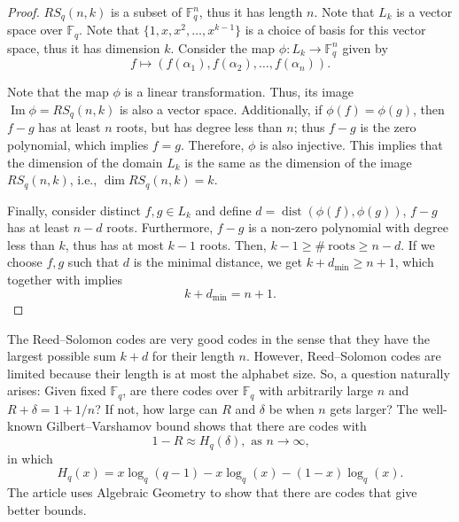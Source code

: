 \documentclass[11pt, oneside]{amsart}
\theoremstyle{definition}
\theoremstyle{remark}
\numberwithin{equation}{section}
\DeclareMathOperator{\dist}{dist}
\DeclareMathOperator{\Ima}{Im}
\DeclareMathOperator{\dimension}{dim}
\begin{document}
\begin{proof}
	$RS_q(n, k)$ is a subset of $\mathbb{F}_q^n$, thus it has length $n$.  
	Note that $ L_k$ is a vector space over $\mathbb{F}_q$.
	Note that $\{1, x, x^2, \dots, x^{k-1}\}$ is a choice of basis for this vector space, thus it has dimension $k$.
	Consider the map $\phi:  L_k \to \mathbb{F}_q^n$ given by 
	\begin{equation}
		f \mapsto (f(\alpha_1), f(\alpha_2), \dots, f(\alpha_n)).
	\end{equation}

	Note that the map $\phi$ is a linear transformation.
	Thus, its image $\Ima \phi = RS_q(n, k)$ is also a vector space.  
	Additionally, if $\phi(f) = \phi(g)$, then $f - g$ has at least $n$ roots, but has degree less than $n$; thus $f - g$ is the zero polynomial, which implies $f = g$.
	Therefore, $\phi$ is also injective.
	This implies that the dimension of the domain $ L_k$ is the same as the dimension of the image $RS_q(n, k)$, i.e.,  $\dimension RS_q(n, k) = k$.
	
	Finally, consider distinct $f, g \in  L_k$ and define $d = \dist(\phi(f), \phi(g))$, $f - g$ has at least $n - d$ roots.
	Furthermore, $f - g$ is a non-zero polynomial with degree less than $k$, thus has at most $k - 1$ roots.
	Then,  $ k - 1 \ge \#\ \text{roots} \ge n - d$.
	If we choose $f, g$ such that $d$ is the minimal distance, we get $k + d_{\mathrm{min}} \ge n + 1$, which together with  implies 
	\begin{equation}
		k + d_\text{min} = n + 1.
	\end{equation}

\end{proof}

The Reed--Solomon codes are very good codes in the sense that they have the largest possible sum $k + d$ for their length $n$.
However, Reed--Solomon codes are limited because their length is at most the alphabet size.
So, a question naturally arises: Given fixed $\mathbb{F}_q$, are there codes over $\mathbb{F}_q$ with arbitrarily large $n$ and $R + \delta = 1 + 1/n$?
If not, how large can $R$ and $\delta$ be when $n$ gets larger?
The well-known Gilbert--Varshamov bound shows that there are codes with 
\begin{equation}
	1 - R \approx H_q(\delta), \text{ as $n \to \infty$,}
\end{equation}
in which
\begin{equation}
	H_q(x) = x \log_q(q-1) - x\log_q(x) - (1-x)\log_q(x).
\end{equation}
The article \cite{TVZ82} uses Algebraic Geometry to show that there are codes that give better bounds.
\end{document}
